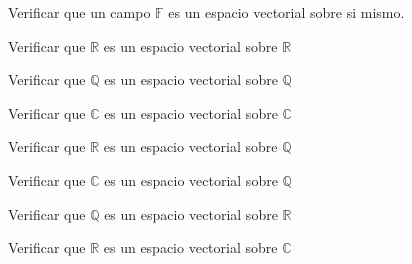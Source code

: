 		\begin{ejercicio}
			Verificar que un campo $\mathbb{F}$ es un espacio vectorial sobre si mismo.
		\end{ejercicio}

		\begin{ejercicio}
			Verificar que $\mathbb{R}$ es un espacio vectorial sobre $\mathbb{R}$
		\end{ejercicio}

		\begin{ejercicio}
			Verificar que $\mathbb{Q}$ es un espacio vectorial sobre $\mathbb{Q}$
		\end{ejercicio}

		\begin{ejercicio}
			Verificar que $\mathbb{C}$ es un espacio vectorial sobre $\mathbb{C}$
		\end{ejercicio}

		\begin{ejercicio}
			Verificar que $\mathbb{R}$ es un espacio vectorial sobre $\mathbb{Q}$
		\end{ejercicio}

		\begin{ejercicio}
			Verificar que $\mathbb{C}$ es un espacio vectorial sobre $\mathbb{Q}$
		\end{ejercicio}

		\begin{ejercicio}
			Verificar que $\mathbb{Q}$ es un espacio vectorial sobre $\mathbb{R}$
		\end{ejercicio}

		\begin{ejercicio}
			Verificar que $\mathbb{R}$ es un espacio vectorial sobre $\mathbb{C}$
		\end{ejercicio}

